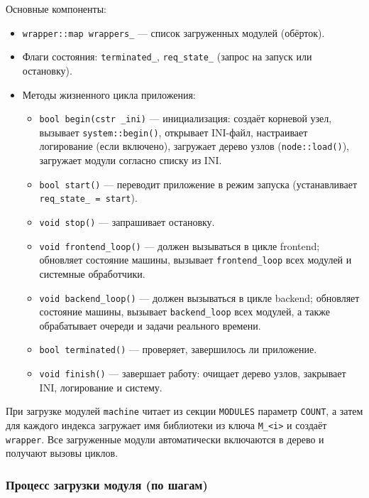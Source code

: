 \documentclass[a4paper,12pt]{article}
\begin{document}
Основные компоненты:
\begin{itemize}
    \item \texttt{wrapper::map wrappers\_} — список загруженных модулей (обёрток).
    \item Флаги состояния: \texttt{terminated\_}, \texttt{req\_state\_} (запрос на запуск или остановку).
    \item Методы жизненного цикла приложения:
        \begin{itemize}
            \item \texttt{bool begin(cstr \_ini)} — инициализация: создаёт корневой узел, вызывает \texttt{system::begin()}, открывает INI-файл, настраивает логирование (если включено), загружает дерево узлов (\texttt{node::load()}), загружает модули согласно списку из INI.
            \item \texttt{bool start()} — переводит приложение в режим запуска (устанавливает \texttt{req\_state\_ = start}).
            \item \texttt{void stop()} — запрашивает остановку.
            \item \texttt{void frontend\_loop()} — должен вызываться в цикле frontend; обновляет состояние машины, вызывает \texttt{frontend\_loop} всех модулей и системные обработчики.
            \item \texttt{void backend\_loop()} — должен вызываться в цикле backend; обновляет состояние машины, вызывает \texttt{backend\_loop} всех модулей, а также обрабатывает очереди и задачи реального времени.
            \item \texttt{bool terminated()} — проверяет, завершилось ли приложение.
            \item \texttt{void finish()} — завершает работу: очищает дерево узлов, закрывает INI, логирование и систему.
        \end{itemize}
\end{itemize}

При загрузке модулей \texttt{machine} читает из секции \texttt{MODULES} параметр \texttt{COUNT}, а затем для каждого индекса загружает имя библиотеки из ключа \texttt{M\_<i>} и создаёт \texttt{wrapper}. Все загруженные модули автоматически включаются в дерево и получают вызовы циклов.

\subsubsection{Процесс загрузки модуля (по шагам)}
\end{document}
